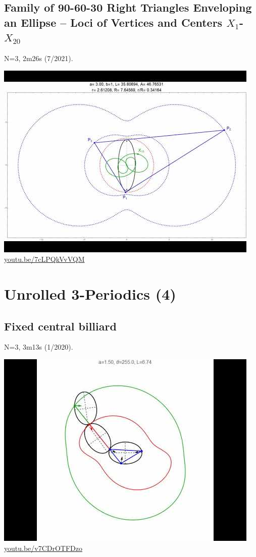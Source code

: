 \documentclass[12pt]{amsart}
\begin{document}
\subsection{Family of 90-60-30 Right Triangles Enveloping an Ellipse -- Loci of Vertices and Centers $X_{1}$-$X_{20}$}
\label{vid:7cLPQkVvVQM}
\noindent N=3, 2m26s (7/2021). 
\begin{center}\includegraphics[width=.5\textwidth]{pics/7cLPQkVvVQM.jpg} \\ 
\href{https://youtu.be/7cLPQkVvVQM}{\url{youtu.be/7cLPQkVvVQM}}\end{center}
% 

\section{Unrolled 3-Periodics (4)}

\subsection{Fixed central billiard}
\label{vid:v7CDrOTFDzo}
\noindent N=3, 3m13s (1/2020). 
\begin{center}\includegraphics[width=.5\textwidth]{pics/v7CDrOTFDzo.jpg} \\ 
\href{https://youtu.be/v7CDrOTFDzo}{\url{youtu.be/v7CDrOTFDzo}}\end{center}
% 
\end{document}
